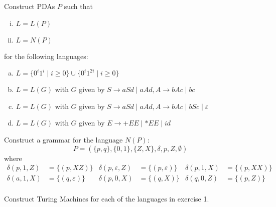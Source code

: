 \begin{solution}
\begin{enumerate}[(a)]
    \end{enumerate}
\end{solution}

\begin{exercise}{2}
    Construct PDAs \(P\) such that
    \begin{enumerate}[i.]
        \item \(L=L(P)\)
        \item \(L=N(P)\)
    \end{enumerate}
    for the following languages:
    \begin{enumerate}[(a)]
        \item \(L=\{0^i1^i\mid i\geq0\} \cup \{0^i1^{2i}\mid i\geq0\}\)
        \item \(L=L(G)\) with \(G\) given by \(S\to aSd\mid aAd, A\to bAc\mid bc\)
        \item \(L=L(G)\) with \(G\) given by \(S\to aSd\mid aAd, A\to bAc\mid bSc\mid\varepsilon \)
        \item \(L=L(G)\) with \(G\) given by \(E\to +EE\mid *EE\mid id\)
    \end{enumerate}
\end{exercise}

\begin{exercise}{3}
    Construct a grammar for the language \(N(P)\):
        \[P = (\{p, q\}, \{0, 1\}, \{Z, X\}, \delta, p, Z, \emptyset)\]
    where
        \begin{align*}
            \delta(p, 1, Z) &= \{(p, XZ)\} &\delta(p, \varepsilon, Z) &= \{(p, \varepsilon)\} &\delta(p, 1, X) &= \{(p, XX)\}\\
            \delta(a, 1, X) &= \{(q, \varepsilon)\} &\delta(p, 0, X) &= \{(q, X)\} &\delta(q, 0, Z) &= \{(p, Z)\}\\
        \end{align*}
\end{exercise}

\begin{exercise}{4}
    Construct Turing Machines for each of the languages in exercise 1.
\end{exercise}